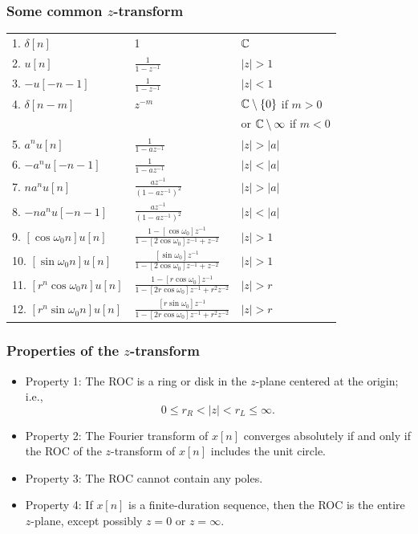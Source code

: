 \begin{frame}
\frametitle{Some common $z$-transform}
\begin{tabular}{lll}
1. $\delta[n]$ &1 &  $\mathbb{C}$ \\
2. $u[n]$ &  $\frac{1}{1-z^{-1}}$& $|z|>1$ \\
3. $-u[-n-1]$ & $\frac{1}{1-z^{-1}}$& $|z|<1$ \\
4. $\delta[n-m]$& $ z^{-m}$ &  $\mathbb{C} \setminus \{0\}$ if $m>0$\\
               &           & or $\mathbb{C} \setminus \infty$ if $m < 0$\\
5. $a^{n}u[n]$ & $\frac{1}{1-az^{-1}}$ & $|z|>|a|$ \\
6. $-a^{n}u[-n-1]$ & $\frac{1}{1-az^{-1}}$ & $|z|<|a|$ \\
7. $na^{n}u[n]$ & $\frac{az^{-1}}{(1-az^{-1})^{2}}$  & $|z|>|a|$ \\
8. $-na^{n}u[-n-1]$ & $\frac{az^{-1}}{(1-az^{-1})^{2}}$ & $|z|<|a|$ \\
9. $[\cos\omega_0n]u[n]$& $\frac{1-[\cos\omega_0]z^{-1}}{1-[2\cos\omega_0]z^{-1}+z^{-2}}$ & $|z|>1$\\
10. $[\sin\omega_0n]u[n]$& $\frac{[\sin\omega_{0}]z^{-1}}{1-[2\cos\omega_0]z^{-1}+z^{-2}}$ & $|z|>1$\\
11. $[r^{n}\cos\omega_0 n]u[n]$ &$\frac{1-[r\cos\omega_0]z^{-1}}{1-[2r\cos\omega_0]z^{-1}+r^{2} z^{-2}}$ &$ |z|>r$ \\
12. $[r^{n}\sin\omega_0n]u[n]$ & $\frac{[r\sin\omega_0]z^{-1}}{1-[2r\cos\omega_0]z^{-1}+r^{2}z^{-2}}$ &$|z|>r$
\end{tabular}
\end{frame}

\begin{frame}
\frametitle{Properties of the $z$-transform}
\begin{itemize}
\item \alert{Property 1}: The ROC is a ring or disk in the $z$-plane centered at the origin; i.e.,
$$
 0\leq r_{R}<|z|<r_{L}\leq\infty.
$$
\item \alert{Property 2}: The Fourier transform of $x[n]$ converges absolutely if and only if the ROC of the $z$-transform of $x[n]$ includes the unit circle.
\item \alert{Property 3}: The ROC cannot contain any poles.
\item \alert{Property 4}: If $x[n]$ is a \alert{finite-duration sequence}, then the ROC is the entire $z$-plane, except possibly $z=0$ or $ z=\infty$.
\end{itemize}
\end{frame}

